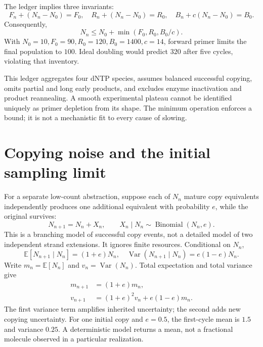 The ledger implies three invariants:
\begin{equation}
F_n+(N_n-N_0)=F_0,\quad
R_n+(N_n-N_0)=R_0,\quad
B_n+c(N_n-N_0)=B_0.
\end{equation}
Consequently,
\begin{equation}
N_n\leq N_0+\min(F_0,R_0,B_0/c).
\end{equation}
With $N_0=10,F_0=90,R_0=120,B_0=1400,c=14$, forward primer limits the final population to $100$. Ideal doubling would predict $320$ after five cycles, violating that inventory.

\begin{center}\end{center}
This ledger aggregates four dNTP species, assumes balanced successful copying, omits partial and long early products, and excludes enzyme inactivation and product reannealing. A smooth experimental plateau cannot be identified uniquely as primer depletion from its shape. The minimum operation enforces a bound; it is not a mechanistic fit to every cause of slowing.


\section{Copying noise and the initial sampling limit}
For a separate low-count abstraction, suppose each of $N_n$ mature copy equivalents independently produces one additional equivalent with probability $e$, while the original survives:
\begin{equation}
N_{n+1}=N_n+X_n,\qquad X_n\mid N_n\sim\operatorname{Binomial}(N_n,e).
\end{equation}
This is a branching model of successful copy events, not a detailed model of two independent strand extensions. It ignores finite resources. Conditional on $N_n$,
\begin{equation}
\mathbb E[N_{n+1}\mid N_n]=(1+e)N_n,\quad
\operatorname{Var}(N_{n+1}\mid N_n)=e(1-e)N_n.
\end{equation}
Write $m_n=\mathbb E[N_n]$ and $v_n=\operatorname{Var}(N_n)$. Total expectation and total variance give
\begin{align}
m_{n+1}&=(1+e)m_n,\\
v_{n+1}&=(1+e)^2v_n+e(1-e)m_n. \label{eq:variance}
\end{align}
The first variance term amplifies inherited uncertainty; the second adds new copying uncertainty. For one initial copy and $e=0.5$, the first-cycle mean is $1.5$ and variance $0.25$. A deterministic model returns a mean, not a fractional molecule observed in a particular realization.

